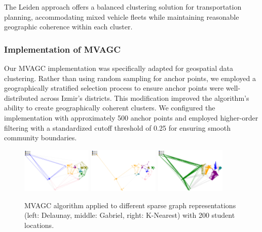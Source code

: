 The Leiden approach offers a balanced clustering solution for transportation planning, accommodating mixed vehicle fleets while maintaining reasonable geographic coherence within each cluster.

\subsubsection{Implementation of MVAGC}
\label{subsubsec:mvagc_implementation}

Our MVAGC implementation was specifically adapted for geospatial data clustering. Rather than using random sampling for anchor points, we employed a geographically stratified selection process to ensure anchor points were well-distributed across Izmir's districts. This modification improved the algorithm's ability to create geographically coherent clusters. We configured the implementation with approximately 500 anchor points and employed higher-order filtering with a standardized cutoff threshold of 0.25 for ensuring smooth community boundaries.

\begin{figure}[htbp]
\centering
\includegraphics[width=0.3\textwidth]{./img/MVAGC_Delaunay}
\hspace{0.2cm}
\includegraphics[width=0.3\textwidth]{./img/MVAGC_Gabriel}
\hspace{0.2cm}
\includegraphics[width=0.3\textwidth]{./img/MVAGC_K}

\caption{MVAGC algorithm applied to different sparse graph representations (left: Delaunay, middle: Gabriel, right: K-Nearest) with 200 student locations.}
\label{fig:mvagc_clustering}
\end{figure}

